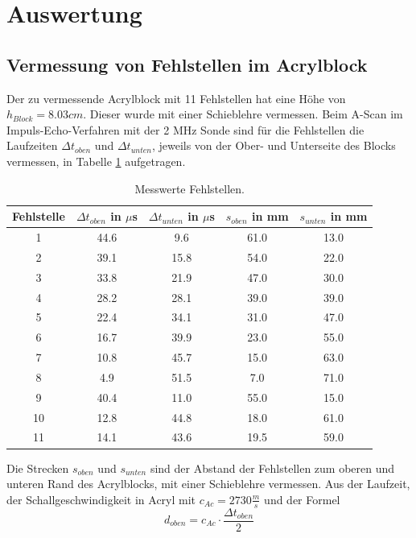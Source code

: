 \section{Auswertung}
\label{sec:Auswertung}

\subsection{Vermessung von Fehlstellen im Acrylblock}
\label{sec:fehlstelle}
Der zu vermessende Acrylblock mit 11 Fehlstellen hat eine Höhe von $h_{Block} = 8.03 cm$.
Dieser wurde mit einer Schieblehre vermessen.
Beim A-Scan im Impuls-Echo-Verfahren mit der 2 MHz Sonde sind für die Fehlstellen die Laufzeiten $\Delta t_{oben}$ und $\Delta t_{unten}$, jeweils von der Ober- und Unterseite des Blocks vermessen, in Tabelle \ref{tab:tab1} aufgetragen.
\begin{table}
  \centering
  \caption{Messwerte Fehlstellen.}
  \label{tab:tab1}
\begin{tabular}{c c c c c}
  \toprule
  Fehlstelle & $\Delta t_{oben}$ in $\mu$s & $\Delta t_{unten}$ in $\mu$s & $s_{oben}$ in mm & $s_{unten}$ in mm\\
  \midrule
  1  &  44.6  &  9.6  &  61.0  &  13.0  \\
  2  &  39.1  &  15.8  &  54.0  &  22.0  \\
  3  &  33.8  &  21.9  &  47.0  &  30.0  \\
  4  &  28.2  &  28.1  &  39.0  &  39.0  \\
  5  &  22.4  &  34.1  &  31.0  &  47.0  \\
  6  &  16.7  &  39.9  &  23.0  &  55.0  \\
  7  &  10.8  &  45.7  &  15.0  &  63.0  \\
  8  &  4.9  &  51.5  &  7.0  &  71.0  \\
  9  &  40.4  &  11.0  &  55.0  &  15.0  \\
  10  &  12.8  &  44.8  &  18.0  &  61.0  \\
  11  &  14.1  &  43.6  &  19.5  &  59.0  \\
  \bottomrule
\end{tabular}
\end{table}
\FloatBarrier
Die Strecken $s_{oben}$ und $s_{unten}$ sind der Abstand der Fehlstellen zum oberen und unteren Rand des Acrylblocks, mit einer Schieblehre vermessen.
Aus der Laufzeit, der Schallgeschwindigkeit in Acryl mit $c_{Ac} = 2730 \frac{m}{s}$ \cite{schall} und der Formel
\begin{equation}
  d_{oben} = c_{Ac} \cdot \frac{\Delta t_{oben}}{2}
  \label{eqn:glA1}
\end{equation}

